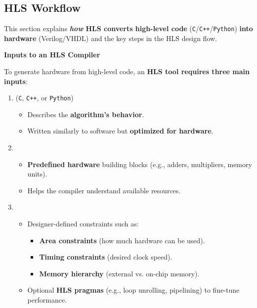 \subsection{HLS Workflow}

This section explains \textbf{\emph{how} HLS converts high-level code} (\texttt{C}/\texttt{C++}/\texttt{Python}) \textbf{into hardware} (Verilog/VHDL) and the key steps in the HLS design flow.

\highspace
\begin{flushleft}
    \textcolor{Green3}{ \textbf{Inputs to an HLS Compiler}}
\end{flushleft}
To generate hardware from high-level code, an \textbf{HLS tool requires three main inputs}:
\begin{enumerate}
    \item {} (\texttt{C}, \texttt{C++}, or \texttt{Python})
    \begin{itemize}
        \item Describes the \textbf{algorithm's behavior}.
        \item Written similarly to software but \textbf{optimized for hardware}.
    \end{itemize}
    \item {}
    \begin{itemize}
        \item \textbf{Predefined hardware} building blocks (e.g., adders, multipliers, memory units).
        \item Helps the compiler understand available resources.
    \end{itemize}
    \item {}
    \begin{itemize}
        \item Designer-defined constraints such as:
        \begin{itemize}
            \item \textbf{Area constraints} (how much hardware can be used).
            \item \textbf{Timing constraints} (desired clock speed).
            \item \textbf{Memory hierarchy} (external vs. on-chip memory).
        \end{itemize}
        \item Optional \textbf{HLS pragmas} (e.g., loop unrolling, pipelining) to fine-tune performance.
    \end{itemize}
\end{enumerate}

